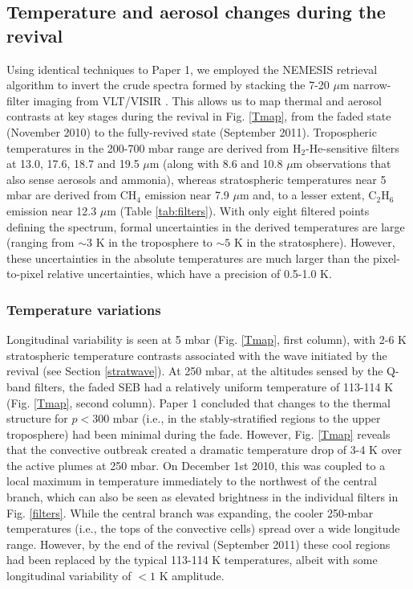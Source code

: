 \documentclass[final,authoryear,5p,times,twocolumn]{elsarticle}
\begin{document}
\subsection{Temperature and aerosol changes during the revival}
\label{summary}

Using identical techniques to Paper 1, we employed the NEMESIS retrieval algorithm to invert the crude spectra formed by stacking the 7-20 $\mu$m narrow-filter imaging from VLT/VISIR \citep{08irwin, 09fletcher_imaging}.  This allows us to map thermal and aerosol contrasts at key stages during the revival in Fig. \ref{Tmap}, from the faded state (November 2010) to the fully-revived state (September 2011).  Tropospheric temperatures in the 200-700 mbar range are derived from H$_2$-He-sensitive filters at 13.0, 17.6, 18.7 and 19.5 $\mu$m (along with 8.6 and 10.8 $\mu$m observations that also sense aerosols and ammonia), whereas stratospheric temperatures near 5 mbar are derived from CH$_4$ emission near 7.9 $\mu$m and, to a lesser extent, C$_2$H$_6$ emission near 12.3 $\mu$m (Table \ref{tab:filters}).  With only eight filtered points defining the spectrum, formal uncertainties in the derived temperatures are large (ranging from $\sim3$ K in the troposphere to $\sim5$ K in the stratosphere). However, these uncertainties in the absolute temperatures are much larger than the pixel-to-pixel relative uncertainties, which have a precision of 0.5-1.0 K.

\subsubsection{Temperature variations}
Longitudinal variability is seen at 5 mbar (Fig. \ref{Tmap}, first column), with 2-6 K stratospheric temperature contrasts associated with the wave initiated by the revival (see Section \ref{stratwave}).  At 250 mbar, at the altitudes sensed by the Q-band filters, the faded SEB had a relatively uniform temperature of 113-114 K (Fig. \ref{Tmap}, second column).  Paper 1 concluded that changes to the thermal structure for $p<300$ mbar (i.e., in the stably-stratified regions to the upper troposphere) had been minimal during the fade.  However, Fig. \ref{Tmap} reveals that the convective outbreak created a dramatic temperature drop of 3-4 K over the active plumes at 250 mbar.  On December 1st 2010, this was coupled to a local maximum in temperature immediately to the northwest of the central branch, which can also be seen as elevated brightness in the individual filters in Fig. \ref{filters}.  While the central branch was expanding, the cooler 250-mbar temperatures (i.e., the tops of the convective cells) spread over a wide longitude range.  However, by the end of the revival (September 2011) these cool regions had been replaced by the typical 113-114 K temperatures, albeit with some longitudinal variability of $<1$ K amplitude.  
\end{document}
